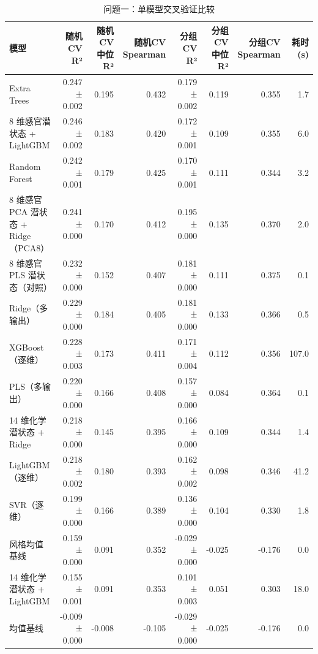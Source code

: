 \begin{table}[tbp]
\centering
\caption{问题一：单模型交叉验证比较}
\label{tab:t02_q1_models}
\footnotesize
\setlength{\tabcolsep}{3.5pt}
\begin{tabular}{lrrrrrrr}
\toprule
模型 & 随机CV R² & 随机CV 中位R² & 随机CV Spearman & 分组CV R² & 分组CV 中位R² & 分组CV Spearman & 耗时 (s) \\
\midrule
Extra Trees & 0.247 ± 0.002 & 0.195 & 0.432 & 0.179 ± 0.002 & 0.119 & 0.355 & 1.7 \\
8 维感官潜状态 + LightGBM & 0.246 ± 0.002 & 0.183 & 0.420 & 0.172 ± 0.001 & 0.109 & 0.355 & 6.0 \\
Random Forest & 0.242 ± 0.001 & 0.179 & 0.425 & 0.170 ± 0.001 & 0.111 & 0.344 & 3.2 \\
8 维感官 PCA 潜状态 + Ridge（PCA8） & 0.241 ± 0.000 & 0.170 & 0.412 & 0.195 ± 0.000 & 0.135 & 0.370 & 2.0 \\
8 维感官 PLS 潜状态（对照） & 0.232 ± 0.000 & 0.152 & 0.407 & 0.181 ± 0.000 & 0.111 & 0.375 & 0.1 \\
Ridge（多输出） & 0.229 ± 0.000 & 0.184 & 0.405 & 0.181 ± 0.000 & 0.133 & 0.366 & 0.5 \\
XGBoost（逐维） & 0.228 ± 0.003 & 0.173 & 0.411 & 0.171 ± 0.004 & 0.112 & 0.356 & 107.0 \\
PLS（多输出） & 0.220 ± 0.000 & 0.166 & 0.408 & 0.157 ± 0.000 & 0.084 & 0.364 & 0.1 \\
14 维化学潜状态 + Ridge & 0.218 ± 0.000 & 0.145 & 0.395 & 0.166 ± 0.000 & 0.109 & 0.344 & 1.4 \\
LightGBM（逐维） & 0.218 ± 0.002 & 0.180 & 0.393 & 0.162 ± 0.002 & 0.098 & 0.346 & 41.2 \\
SVR（逐维） & 0.199 ± 0.000 & 0.166 & 0.389 & 0.136 ± 0.000 & 0.104 & 0.330 & 1.8 \\
风格均值基线 & 0.159 ± 0.000 & 0.091 & 0.352 & -0.029 ± 0.000 & -0.025 & -0.176 & 0.0 \\
14 维化学潜状态 + LightGBM & 0.155 ± 0.001 & 0.091 & 0.353 & 0.101 ± 0.003 & 0.051 & 0.303 & 18.0 \\
均值基线 & -0.009 ± 0.000 & -0.008 & -0.105 & -0.029 ± 0.000 & -0.025 & -0.176 & 0.0 \\
\bottomrule
\end{tabular}
\end{table}
